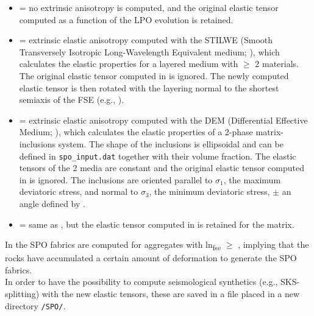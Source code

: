 \begin{itemize}
    \item[]  = no extrinsic anisotropy is computed, and the original elastic tensor computed as a function of the LPO evolution is retained.
    
    \item[]  = extrinsic elastic anisotropy computed with the STILWE (Smooth Transversely Isotropic Long-Wavelength Equivalent medium; \citep{backus1962jgr}), which calculates the elastic properties for a layered medium with $\geq$ 2 materials. The original elastic tensor computed in \drexmtitle{} is ignored. The newly computed elastic tensor is then rotated with the layering normal to the shortest semiaxis of the FSE (e.g., \citet{olson1984jgr}).
    
    \item[]  = extrinsic elastic anisotropy computed with the DEM (Differential Effective Medium; \citep{mclaughlin1977,mainprice1997tect}), which calculates the elastic properties of a 2-phase matrix-inclusions system. The shape of the inclusions is ellipsoidal and can be defined in \texttt{spo\_input.dat} together with their volume fraction. The elastic tensors of the 2 media are constant and the original elastic tensor computed in \drexmtitle{} is ignored. The inclusions are oriented parallel to $\sigma_1$, the maximum deviatoric stress, and normal to $\sigma_3$, the minimum deviatoric stress, $\pm$ an angle defined by .

    \item[]  = same as , but the elastic tensor computed in \drexmtitle{} is retained for the matrix.
\end{itemize}


In \viztomotitle{} the SPO fabrics are computed for aggregates with ln\textsubscript{fse} $\geq$ , implying that the rocks have accumulated a certain amount of deformation to generate the SPO fabrics. \\
In order to have the possibility to compute seismological synthetics (e.g., SKS-splitting) with the new elastic tensors, these are saved in a \cijkltitle{} file placed in a new directory \texttt{/SPO/}.\\


